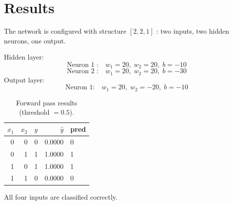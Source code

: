 \documentclass[11pt,a4paper]{article}
\begin{document}
\section{Results}

The network is configured with structure $[2, 2, 1]$ : two inputs, two hidden
neurons, one output.  

\medskip
\noindent Hidden layer:
\[
\text{Neuron 1 :}\quad w_1 = 20,\; w_2 = 20,\; b = -10
\]
\[
\text{Neuron 2 :}\quad w_1 = 20,\; w_2 = 20,\; b = -30
\]
Output layer:
\[
\text{Neuron 1:}\quad w_1 = 20,\; w_2 = -20,\; b = -10
\]


\begin{table}[H]
\centering
\begin{tabular}{rrrrl}
\toprule
$x_1$ & $x_2$ & $y$ & $\hat{y}$ & pred \\
\midrule
0 & 0 & 0 & 0.0000 & 0 \\
0 & 1 & 1 & 1.0000 & 1 \\
1 & 0 & 1 & 1.0000 & 1 \\
1 & 1 & 0 & 0.0000 & 0 \\
\bottomrule
\end{tabular}
\caption{Forward pass results (threshold $= 0.5$).}
\end{table}

All four inputs are classified correctly.  
\end{document}
